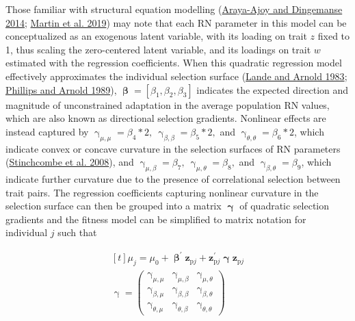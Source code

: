 \documentclass{article}
\begin{document}
Those familiar with structural equation modelling
(\protect\hyperlink{ref-Araya2014}{Araya-Ajoy and Dingemanse 2014};
\protect\hyperlink{ref-Martin2019}{Martin et al. 2019}) may note that
each RN parameter in this model can be conceptualized as an exogenous
latent variable, with its loading on trait \(z\) fixed to 1, thus
scaling the zero-centered latent variable, and its loadings on trait
\(w\) estimated with the regression coefficients. When this quadratic
regression model effectively approximates the individual selection
surface (\protect\hyperlink{ref-Lande1983}{Lande and Arnold 1983};
\protect\hyperlink{ref-Phillips1989}{Phillips and Arnold 1989}),
\(\boldsymbol{\upbeta}=\left[\beta_1,\beta_2,\beta_3 \right]\) indicates
the expected direction and magnitude of unconstrained adaptation in the
average population RN values, which are also known as directional
selection gradients. Nonlinear effects are instead captured by
\(\upgamma _{\mu,\mu}=\beta_4*2, \ \upgamma _{\beta,\beta}= \beta_5*2,\)
and \(\upgamma _{\theta,\theta}= \beta_6*2\), which indicate convex or
concave curvature in the selection surfaces of RN parameters
(\protect\hyperlink{ref-Stinch2008}{Stinchcombe et al. 2008}), and
\(\upgamma _{\mu,\beta}=\beta_7, \ \upgamma _{\mu,\theta}=\beta_8,\) and
\(\upgamma _{\beta,\theta}=\beta_9\), which indicate further curvature
due to the presence of correlational selection between trait pairs. The
regression coefficients capturing nonlinear curvature in the selection
surface can then be grouped into a matrix \(\boldsymbol{\upgamma}\) of
quadratic selection gradients and the fitness model can be simplified to
matrix notation for individual \(j\) such that

\begin{equation} \tag{1.3}\label{eq:1.3}
\begin{gathered}[t]
\mu_{j} = \mu_0 + \boldsymbol{\upbeta}^{{\prime}}\boldsymbol{z}_{\boldsymbol{\mathrm{p}}j} + \boldsymbol{z}^{\prime}_{\boldsymbol{\mathrm{p}}j} \boldsymbol{\upgamma} \boldsymbol{z}_{\boldsymbol{\mathrm{p}}j} \\
\boldsymbol{\mathrm{\upgamma}} =
\begin{pmatrix}
\upgamma _{\mu,\mu} & 
\upgamma _{\mu,\beta} &
\upgamma _{\mu,\theta} \\
\upgamma _{\beta,\mu} & \upgamma _{\beta,\beta} & \upgamma _{\beta,\theta} \\
\upgamma _{\theta,\mu} & \upgamma _{\theta,\beta} & \upgamma _{\theta,\theta} 
\end{pmatrix} \nonumber
\end{gathered}
\end{equation}
\end{document}
